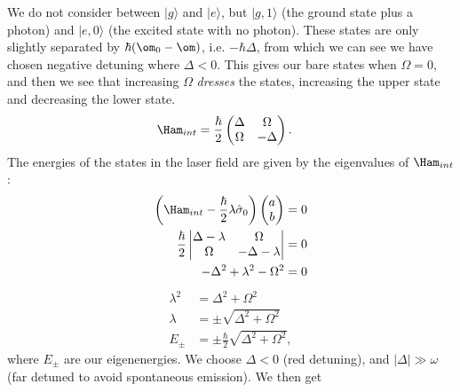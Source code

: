 \documentclass[a4paper, 11pt, normalem]{report}
\begin{document}
We do not consider between $|g\rangle$ and $|e\rangle$, but $|g,1\rangle$ (the ground state plus a photon) and $|e,0\rangle$ (the excited state with no photon).
These states are only slightly separated by $\hbar(\om_0-\om)$, i.e. $-\hbar\Delta$, from which we can see we have chosen negative detuning where $\Delta < 0$.
This gives our bare states when $\Omega=0$, and then we see that increasing $\Omega$ \emph{dresses} the states, increasing the upper state and decreasing the lower state.
\begin{align}
    \Ham_{int} &= \frac{\hbar}{2}\begin{pmatrix}\Delta & \Omega \\ \Omega & -\Delta\end{pmatrix}.
\end{align}
The energies of the states in the laser field are given by the eigenvalues of $\Ham_{int}$:
\begin{align}
    \left(\Ham_{int}-\frac{\hbar}{2}\lambda\hat{\sigma}_0\right)\begin{pmatrix}a\\ b\end{pmatrix} &= 0 \\
    \frac{\hbar}{2}\begin{vmatrix} \Delta-\lambda & \Omega \\ \Omega & -\Delta-\lambda \end{vmatrix} &= 0 \\
    -\Delta^2+\lambda^2-\Omega^2 &= 0
\end{align}
\begin{align}
    \lambda^2 &= \Delta^2+\Omega^2 \\
    \lambda &= \pm\sqrt{\Delta^2+\Omega^2} \\
    E_{\pm} &= \pm\frac{\hbar}{2}\sqrt{\Delta^2+\Omega^2},
\end{align}
where $E_\pm$ are our eigenenergies.
We choose $\Delta<0$ (red detuning), and $|\Delta|\gg\omega$ (far detuned to avoid spontaneous emission).
We then get
\end{document}
